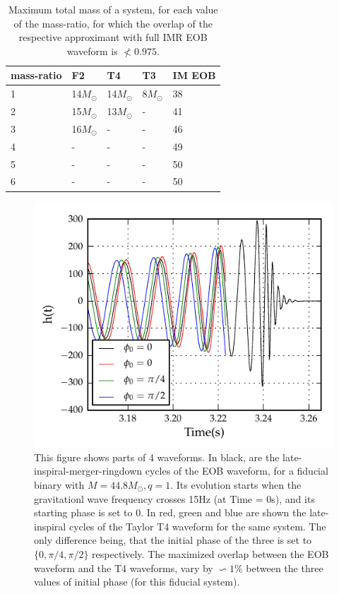 \documentclass[aps,
prd,
amsmath,
amssymb,
twocolumn,
floatfix,
groupedaddress]{revtex4-1}
\begin{document}
\begin{table}[h]
\caption{\label{tab:maxTotalMassOlap} Maximum total mass of a system, for each value of the mass-ratio, for which the overlap of the respective approximant with full IMR EOB waveform is $\not< 0.975$.}
\begin{ruledtabular}
\begin{tabular}{|m{}| m{}| m{}| m{}| m{}|}
mass-ratio & F2 & T4 & T3 & IM EOB\tabularnewline \hline
1 & 14$M_{\odot}$ & 14$M_{\odot}$ & 8$M_{\odot}$ & 38\tabularnewline \hline
2 & 15$M_{\odot}$ & 13$M_{\odot}$ & - & 41\tabularnewline \hline
3 & 16$M_{\odot}$ & - & - & 46\tabularnewline \hline
4 & - & - & - & 49\tabularnewline \hline
5 & - & - & - & 50\tabularnewline \hline
6 & - & - & - & 50\tabularnewline \hline
\end{tabular}
\end{ruledtabular}
\end{table}


\begin{figure}[h]
\includegraphics[scale=1.0, clip=false, keepaspectratio=true, width=\columnwidth]{tdwaveform_phi0.pdf}
\caption{\label{fig:Olapphi0}This figure shows parts of 4 waveforms. In black, are the late-inspiral-merger-ringdown cycles of the EOB waveform, for a fiducial binary with $M=44.8M_{\odot},q=1$. Its evolution starts when the gravitationl wave frequency crosses 15Hz (at Time = 0s), and its starting phase is set to 0. In red, green and blue are shown the late-inspiral cycles of the Taylor T4 waveform for the same system. The only difference being, that the initial phase of the three is set to $\{0,\pi/4,\pi/2\}$ respectively. The maximized overlap between the EOB waveform and the T4 waveforms, vary by $\backsim1\%$ between the three values of initial phase (for this fiducial system).}
\end{figure}
\end{document}
